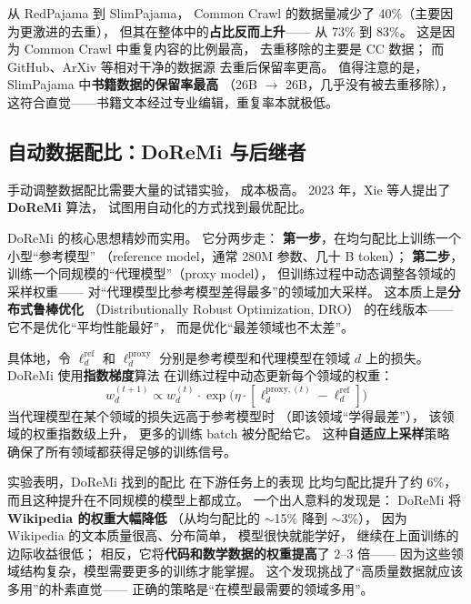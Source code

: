 从 RedPajama 到 SlimPajama，
Common Crawl 的数据量减少了 40\%（主要因为更激进的去重），
但其在整体中的\textbf{占比反而上升}——
从 73\% 到 83\%。
这是因为 Common Crawl 中重复内容的比例最高，
去重移除的主要是 CC 数据；
而 GitHub、ArXiv 等相对干净的数据源
去重后保留率更高。
值得注意的是，SlimPajama 中\textbf{书籍数据的保留率最高}
（26B $\to$ 26B，几乎没有被去重移除），
这符合直觉——书籍文本经过专业编辑，重复率本就极低。

\subsection{自动数据配比：DoReMi 与后继者}

手动调整数据配比需要大量的试错实验，
成本极高。
2023 年，Xie 等人提出了 \textbf{DoReMi} 算法，
试图用自动化的方式找到最优配比。

DoReMi 的核心思想精妙而实用。
它分两步走：
\textbf{第一步}，在均匀配比上训练一个小型``参考模型''
（reference model，通常 280M 参数、几十 B token）；
\textbf{第二步}，训练一个同规模的``代理模型''（proxy model），
但训练过程中动态调整各领域的采样权重——
对``代理模型比参考模型差得最多''的领域加大采样。
这本质上是\textbf{分布式鲁棒优化}
（Distributionally Robust Optimization, DRO）
的在线版本——
它不是优化``平均性能最好''，
而是优化``最差领域也不太差''。

具体地，令 $\ell_d^{\text{ref}}$ 和 $\ell_d^{\text{proxy}}$
分别是参考模型和代理模型在领域 $d$ 上的损失。
DoReMi 使用\textbf{指数梯度}算法
在训练过程中动态更新每个领域的权重：
\begin{equation}
  w_d^{(t+1)} \propto w_d^{(t)} \cdot
  \exp\!\bigl(\eta \cdot [\ell_d^{\text{proxy},(t)} - \ell_d^{\text{ref}}]\bigr)
\end{equation}
当代理模型在某个领域的损失远高于参考模型时
（即该领域``学得最差''），
该领域的权重指数级上升，
更多的训练 batch 被分配给它。
这种\textbf{自适应上采样}策略
确保了所有领域都获得足够的训练信号。

实验表明，DoReMi 找到的配比
在下游任务上的表现
比均匀配比提升了约 6\%，
而且这种提升在不同规模的模型上都成立。
一个出人意料的发现是：
DoReMi 将 \textbf{Wikipedia 的权重大幅降低}
（从均匀配比的 $\sim$15\% 降到 $\sim$3\%），
因为 Wikipedia 的文本质量很高、分布简单，
模型很快就能学好，
继续在上面训练的边际收益很低；
相反，它将\textbf{代码和数学数据的权重提高}了 2--3 倍——
因为这些领域结构复杂，模型需要更多的训练才能掌握。
这个发现挑战了``高质量数据就应该多用''的朴素直觉——
正确的策略是``在模型最需要的领域多用''。

